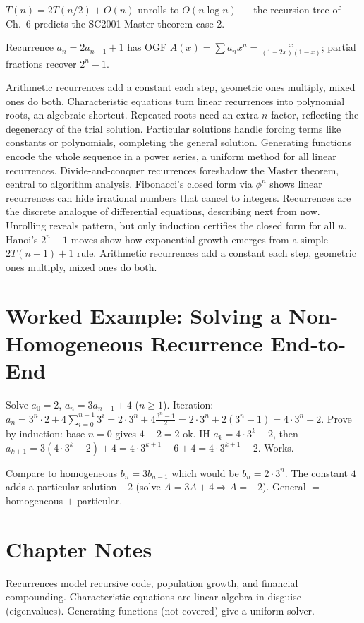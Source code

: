 \begin{example}
$T(n)=2T(n/2)+O(n)$ unrolls to $O(n\log n)$ --- the recursion tree of Ch.~6 predicts the SC2001 Master theorem case 2.
\end{example}

\begin{theorem}
Recurrence $a_n=2a_{n-1}+1$ has OGF $A(x)=\sum a_nx^n =\frac{x}{(1-2x)(1-x)}$; partial fractions recover $2^n-1$.
\end{theorem}

Arithmetic recurrences add a constant each step, geometric ones multiply, mixed ones do both.
Characteristic equations turn linear recurrences into polynomial roots, an algebraic shortcut.
Repeated roots need an extra $n$ factor, reflecting the degeneracy of the trial solution.
Particular solutions handle forcing terms like constants or polynomials, completing the general solution.
Generating functions encode the whole sequence in a power series, a uniform method for all linear recurrences.
Divide-and-conquer recurrences foreshadow the Master theorem, central to algorithm analysis.
Fibonacci's closed form via $\phi^n$ shows linear recurrences can hide irrational numbers that cancel to integers.
Recurrences are the discrete analogue of differential equations, describing next from now.
Unrolling reveals pattern, but only induction certifies the closed form for all $n$.
Hanoi's $2^n-1$ moves show how exponential growth emerges from a simple $2T(n-1)+1$ rule.
Arithmetic recurrences add a constant each step, geometric ones multiply, mixed ones do both.

\section{Worked Example: Solving a Non-Homogeneous Recurrence End-to-End}
Solve $a_0=2$, $a_n=3a_{n-1}+4$ ($n\ge1$). Iteration: $a_n=3^n\cdot2+4\sum_{i=0}^{n-1}3^i=2\cdot3^n+4\frac{3^n-1}{2}=2\cdot3^n+2(3^n-1)=4\cdot3^n-2$. Prove by induction: base $n=0$ gives $4-2=2$ ok. IH $a_k=4\cdot3^k-2$, then $a_{k+1}=3(4\cdot3^k-2)+4=4\cdot3^{k+1}-6+4=4\cdot3^{k+1}-2$. Works.

Compare to homogeneous $b_n=3b_{n-1}$ which would be $b_n=2\cdot3^n$. The constant $4$ adds a particular solution $-2$ (solve $A=3A+4\Rightarrow A=-2$). General $=$ homogeneous $+$ particular.

\section{Chapter Notes}
Recurrences model recursive code, population growth, and financial compounding. Characteristic equations are linear algebra in disguise (eigenvalues). Generating functions (not covered) give a uniform solver.

